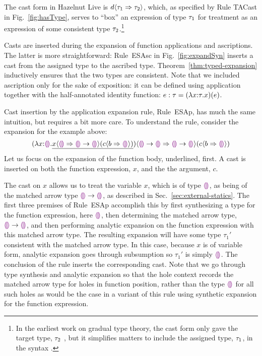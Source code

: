 The cast form in Hazelnut Live is $d \langle{\tau_1}\Rightarrow{\tau_2}\rangle$, which, as specified by Rule TACast in Fig.~\ref{fig:hasType}, serves to ``box'' an expression of type $\tau_1$ for treatment as an expression of some consistent type $\tau_2$.\footnote{In the earliest work on gradual type theory, the cast form only gave the target type, $\tau_2$ \cite{Siek06a}, but it simplifies matters to include the assigned type, $\tau_1$, in the syntax \cite{DBLP:conf/snapl/SiekVCB15}.}

Casts are inserted during the expansion of function applications and ascriptions. The latter is more straightforward: Rule~{ESAsc} in Fig.~\ref{fig:expandSyn} inserts a cast from the assigned type to the ascribed  type. Theorem~\ref{thm:typed-expansion} inductively ensures that the two types are consistent.  Note that we included ascription only for the sake of exposition: it can be defined using application together with the half-annotated identity function: $e : \tau = (\lambda x{:}\tau.x)(e)$.
%

Cast insertion by the application expansion rule, Rule~{ESAp}, has much the same intuition, but requires a bit more care. To understand the rule, consider the expansion for the example above:
\[(\lambda x{:}\textcolor{violet}{\llparenthesis}\textcolor{violet}{\rrparenthesis}.\underline{x \langle{\textcolor{violet}{\llparenthesis}\textcolor{violet}{\rrparenthesis}}\Rightarrow{\textcolor{violet}{\llparenthesis}\textcolor{violet}{\rrparenthesis}\rightarrow \textcolor{violet}{\llparenthesis}\textcolor{violet}{\rrparenthesis}}\rangle(c \langle{b}\Rightarrow{\textcolor{violet}{\llparenthesis}\textcolor{violet}{\rrparenthesis}}\rangle)}) \langle{\textcolor{violet}{\llparenthesis}\textcolor{violet}{\rrparenthesis}\rightarrow \textcolor{violet}{\llparenthesis}\textcolor{violet}{\rrparenthesis}}\Rightarrow{\textcolor{violet}{\llparenthesis}\textcolor{violet}{\rrparenthesis}\rightarrow \textcolor{violet}{\llparenthesis}\textcolor{violet}{\rrparenthesis}}\rangle(c \langle{b}\Rightarrow{\textcolor{violet}{\llparenthesis}\textcolor{violet}{\rrparenthesis}}\rangle)
\]
Let us focus on the expansion of the function body, underlined, first. A cast is inserted on both the function expression, $x$, and the the argument, $c$. 

The cast on $x$ allows us to treat the variable $x$, which is of type $\textcolor{violet}{\llparenthesis}\textcolor{violet}{\rrparenthesis}$, as being of the matched arrow type $\textcolor{violet}{\llparenthesis}\textcolor{violet}{\rrparenthesis} \rightarrow \textcolor{violet}{\llparenthesis}\textcolor{violet}{\rrparenthesis}$, as described in Sec.~\ref{sec:external-statics}. The first three premises of Rule~{ESAp} accomplish this by first synthesizing a type for the function expression, here $\textcolor{violet}{\llparenthesis}\textcolor{violet}{\rrparenthesis}$, then determining the matched arrow type, $\textcolor{violet}{\llparenthesis}\textcolor{violet}{\rrparenthesis} \rightarrow \textcolor{violet}{\llparenthesis}\textcolor{violet}{\rrparenthesis}$, and then performing analytic expansion on the function expression with this matched arrow type. The resulting expansion will have some type $\tau_1'$ consistent with the matched arrow type. In this case, because $x$ is of variable form, analytic expansion goes through subsumption so $\tau_1'$ is simply $\textcolor{violet}{\llparenthesis}\textcolor{violet}{\rrparenthesis}$. The conclusion of the rule inserts the corresponding cast. Note that we go through type synthesis and analytic expansion so that the hole context records the matched arrow type for holes in function position, rather than the type $\textcolor{violet}{\llparenthesis}\textcolor{violet}{\rrparenthesis}$ for all such holes as would be the case in a variant of this rule using synthetic expansion for the function expression.


